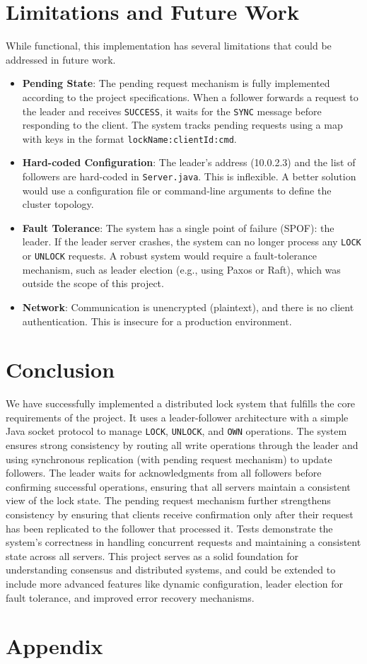 \documentclass[a4paper,11pt]{article}
\begin{document}
\section{Limitations and Future Work}
While functional, this implementation has several limitations that could be addressed in future work.
\begin{itemize}
    \item \textbf{Pending State}: The pending request mechanism is fully implemented according to the project specifications. When a follower forwards a request to the leader and receives \texttt{SUCCESS}, it waits for the \texttt{SYNC} message before responding to the client. The system tracks pending requests using a map with keys in the format \texttt{lockName:clientId:cmd}.
    \item \textbf{Hard-coded Configuration}: The leader's address (10.0.2.3) and the list of followers are hard-coded in \texttt{Server.java}. This is inflexible. A better solution would use a configuration file or command-line arguments to define the cluster topology.
    \item \textbf{Fault Tolerance}: The system has a single point of failure (SPOF): the leader. If the leader server crashes, the system can no longer process any \texttt{LOCK} or \texttt{UNLOCK} requests. A robust system would require a fault-tolerance mechanism, such as leader election (e.g., using Paxos or Raft), which was outside the scope of this project.
    \item \textbf{Network}: Communication is unencrypted (plaintext), and there is no client authentication. This is insecure for a production environment.
\end{itemize}

\section{Conclusion}
We have successfully implemented a distributed lock system that fulfills the core requirements of the project. It uses a leader-follower architecture with a simple Java socket protocol to manage \texttt{LOCK}, \texttt{UNLOCK}, and \texttt{OWN} operations. The system ensures strong consistency by routing all write operations through the leader and using synchronous replication (with pending request mechanism) to update followers. The leader waits for acknowledgments from all followers before confirming successful operations, ensuring that all servers maintain a consistent view of the lock state. The pending request mechanism further strengthens consistency by ensuring that clients receive confirmation only after their request has been replicated to the follower that processed it. Tests demonstrate the system's correctness in handling concurrent requests and maintaining a consistent state across all servers. This project serves as a solid foundation for understanding consensus and distributed systems, and could be extended to include more advanced features like dynamic configuration, leader election for fault tolerance, and improved error recovery mechanisms.

\section{Appendix}
\end{document}

